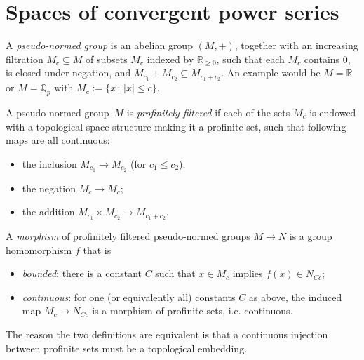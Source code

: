 \section{Spaces of convergent power series}

\begin{definition}
  \label{pseudo_normed_group}
  \leanok
  A \emph{pseudo-normed group} is an abelian group $(M,+)$,
  together with an increasing filtration $M_c \subseteq M$ of subsets $M_c$ indexed by $\mathbb R_{\ge 0}$,
  such that each $M_c$ contains $0$, is closed under negation,
  and $M_{c_1} + M_{c_2} \subseteq M_{c_1 + c_2}$. An example would be $M=\mathbb{R}$ or $M=\mathbb{Q}_p$ with $M_c :=\{x\,:\,|x|\leq c\}$.

  A pseudo-normed group~$M$ is \emph{profinitely filtered}
  if each of the sets $M_c$ is endowed with a topological space structure
  making it a profinite set, such that following maps are all continuous:
  \begin{itemize}
    \item the inclusion $M_{c_1} \to M_{c_2}$ (for $c_1 \le c_2$);
    \item the negation $M_c \to M_c$;
    \item the addition $M_{c_1} \times M_{c_2} \to M_{c_1 + c_2}$.
  \end{itemize}

  
  A \emph{morphism} of profinitely filtered pseudo-normed groups $M \to N$
  is a group homomorphism $f$ that is
  \begin{itemize}
    \item \emph{bounded}:
      there is a constant $C$
      such that $x \in M_c$ implies $f(x) \in N_{Cc}$;
    \item \emph{continuous}:
      for one (or equivalently all) constants $C$ as above,
      the induced map $M_c \to N_{Cc}$ is
      a morphism of profinite sets, i.e. continuous.
  \end{itemize}

  The reason the two definitions are equivalent is that a continuous injection between profinite sets must be a topological embedding.
\end{definition}

